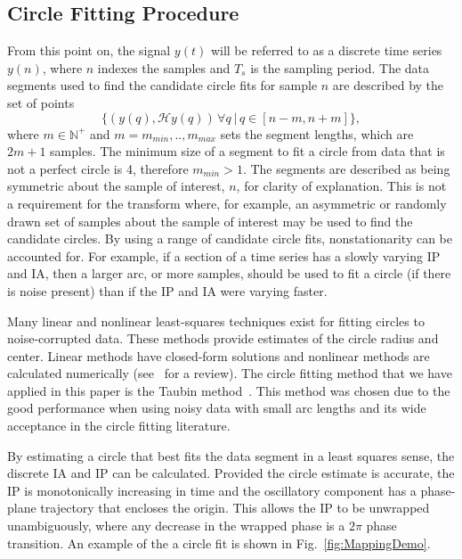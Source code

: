 \documentclass[journal,11pt,a4paper,onecolumn,draftcls]{IEEEtran}
\begin{document}
\subsection{Circle Fitting Procedure}\label{sect:CircleFittingProcedure}
From this point on, the signal $y(t)$ will be referred to as a discrete time series $y(n)$, where $n$ indexes the samples and $T_s$ is the sampling period. The data segments used to find the candidate circle fits for sample $n$ are described by the set of points
\begin{equation}\label{eq:DataSegment}
\{\left(y\left(q\right),\mathcal{H}y\left(q\right)\right)  \,\forall q \ | \, q \in [n-m,n+m]\},
\end{equation}
where $m\in\mathbb{N}^+$ and $m=m_{min},..,m_{max}$ sets the segment lengths, which are $2m+1$ samples. The minimum size of a segment to fit a circle from data that is not a perfect circle is 4, therefore $m_{min}>1$. The segments are described as being symmetric about the sample of interest, $n$, for clarity of explanation. This is not a requirement for the transform where, for example, an asymmetric or randomly drawn set of samples about the sample of interest may be used to find the candidate circles. By using a range of candidate circle fits, nonstationarity can be accounted for. For example, if a section of a time series has a slowly varying IP and IA, then a larger arc, or more samples, should be used to fit a circle (if there is noise present) than if the IP and IA were varying faster.

Many linear and nonlinear least-squares techniques exist for fitting circles to noise-corrupted data. These methods provide estimates of the circle radius and center. Linear methods have closed-form solutions and nonlinear methods are calculated numerically (see~\cite{Chernov2005} for a review). The circle fitting method that we have applied in this paper is the Taubin method~\cite{Taubin1991}. This method was chosen due to the good performance when using noisy data with small arc lengths and its wide acceptance in the circle fitting literature.

By estimating a circle that best fits the data segment in a least squares sense, the discrete IA and IP can be calculated. Provided the circle estimate is accurate, the IP is monotonically increasing in time and the oscillatory component has a phase-plane trajectory that encloses the origin. This allows the IP to be unwrapped unambiguously, where any decrease in the wrapped phase is a $2\pi$ phase transition. An example of the a circle fit is shown in Fig.~\ref{fig:MappingDemo}.
\end{document}
